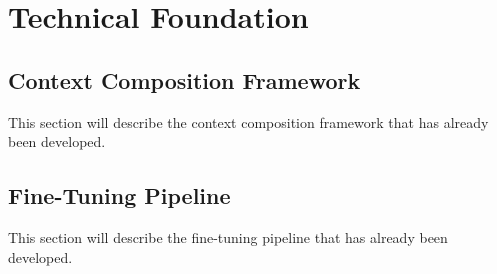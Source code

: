 \chapter{Technical Foundation}\label{chap:technical-foundation}  %

\section{Context Composition Framework}

This section will describe the context composition framework that has already been developed.

\section{Fine-Tuning Pipeline}

This section will describe the fine-tuning pipeline that has already been developed.
